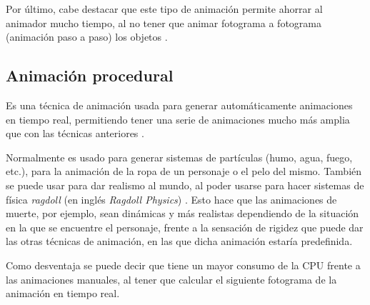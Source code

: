 \documentclass{article}
\begin{document}
\bigskip

Por último, cabe destacar que este tipo de animación permite ahorrar al animador mucho tiempo, al no tener que animar fotograma a fotograma (animación paso a paso) los objetos \cite{keyframe}.


\subsection{Animación procedural}

Es una técnica de animación usada para generar automáticamente animaciones en tiempo real, permitiendo tener una serie de animaciones mucho más amplia que con las técnicas anteriores \cite{proc}.

\bigskip

Normalmente es usado para generar sistemas de partículas (humo, agua, fuego, etc.), para la animación de la ropa de un personaje o el pelo del mismo. También se puede usar para dar realismo al mundo, al poder usarse para hacer sistemas de física \textit{ragdoll} (en inglés \textit{Ragdoll Physics}) \cite{ragdoll}. 
Esto hace que las animaciones de muerte, por ejemplo, sean dinámicas y más realistas dependiendo de la situación en la que se encuentre el personaje, frente a la sensación de rigidez que puede dar las otras técnicas de animación, en las que dicha animación estaría predefinida.

\bigskip

Como desventaja se puede decir que tiene un mayor consumo de la CPU frente a las animaciones manuales, al tener que calcular el siguiente fotograma de la animación en tiempo real.

\newpage

\end{document}
